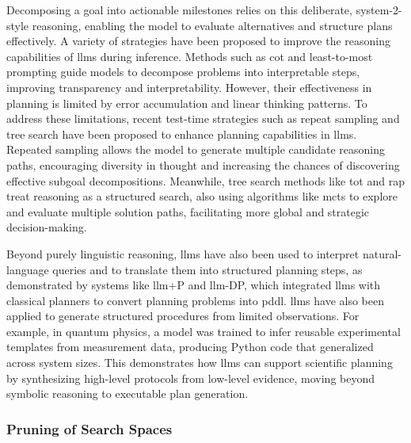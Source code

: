 Decomposing a goal into actionable milestones relies on this deliberate, system-2-style reasoning, enabling the model to evaluate alternatives and structure plans effectively. 
A variety of strategies have been proposed to improve the reasoning capabilities of \glspl{llm} during inference. 
Methods such as \gls{cot} and least-to-most prompting guide models to decompose problems into interpretable steps, improving transparency and interpretability. 
However, their effectiveness in planning is limited by error accumulation and linear thinking patterns.\autocite{stechly2024chain}
To address these limitations, recent test-time strategies such as repeat sampling and tree search have been proposed to enhance planning capabilities in \glspl{llm}. 
Repeated sampling allows the model to generate multiple candidate reasoning paths, encouraging diversity in thought and increasing the chances of discovering effective subgoal decompositions. \autocite{wang2024planning}
Meanwhile, tree search methods like \gls{tot} and \gls{rap} treat reasoning as a structured search, also using algorithms like \gls{mcts} to explore and evaluate multiple solution paths, facilitating more global and strategic decision-making. \autocite{hao2023reasoning}

Beyond purely linguistic reasoning, \glspl{llm} have also been used to interpret natural-language queries and to translate them into structured planning steps, as demonstrated by systems like \gls{llm}+P\autocite{liu2023llm} and \gls{llm}-DP\autocite{dagan2023dynamic}, which integrated \glspl{llm} with classical planners to convert planning problems into \gls{pddl}.
\glspl{llm} have also been applied to generate structured procedures from limited observations. For example, in quantum physics, a model was trained to infer reusable experimental templates from measurement data, producing Python code that generalized across system sizes. \autocite{arlt2024meta0designing} This demonstrates how \glspl{llm} can support scientific planning by synthesizing high-level protocols from low-level evidence, moving beyond symbolic reasoning to executable plan generation.

\subsubsection{Pruning of Search Spaces}

